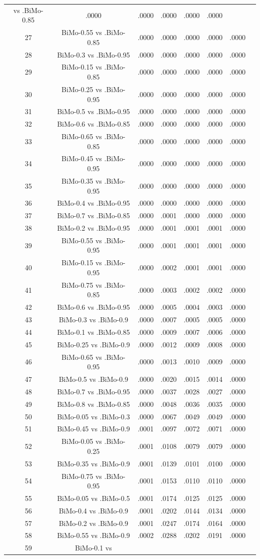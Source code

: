 \documentclass[a4paper,10pt]{article}
\begin{document}
\begin{landscape}
\begin{table}[!htp]
\begin{tabular}{cccccccc}
vs .BiMo-0.85&.0000&.0000&.0000&.0000&.0000\\27&BiMo-0.55 vs .BiMo-0.85&.0000&.0000&.0000&.0000&.0000\\28&BiMo-0.3 vs .BiMo-0.95&.0000&.0000&.0000&.0000&.0000\\29&BiMo-0.15 vs .BiMo-0.85&.0000&.0000&.0000&.0000&.0000\\30&BiMo-0.25 vs .BiMo-0.95&.0000&.0000&.0000&.0000&.0000\\31&BiMo-0.5 vs .BiMo-0.95&.0000&.0000&.0000&.0000&.0000\\32&BiMo-0.6 vs .BiMo-0.85&.0000&.0000&.0000&.0000&.0000\\33&BiMo-0.65 vs .BiMo-0.85&.0000&.0000&.0000&.0000&.0000\\34&BiMo-0.45 vs .BiMo-0.95&.0000&.0000&.0000&.0000&.0000\\35&BiMo-0.35 vs .BiMo-0.95&.0000&.0000&.0000&.0000&.0000\\36&BiMo-0.4 vs .BiMo-0.95&.0000&.0000&.0000&.0000&.0000\\37&BiMo-0.7 vs .BiMo-0.85&.0000&.0001&.0000&.0000&.0000\\38&BiMo-0.2 vs .BiMo-0.95&.0000&.0001&.0001&.0001&.0000\\39&BiMo-0.55 vs .BiMo-0.95&.0000&.0001&.0001&.0001&.0000\\40&BiMo-0.15 vs .BiMo-0.95&.0000&.0002&.0001&.0001&.0000\\41&BiMo-0.75 vs .BiMo-0.85&.0000&.0003&.0002&.0002&.0000\\42&BiMo-0.6 vs .BiMo-0.95&.0000&.0005&.0004&.0003&.0000\\43&BiMo-0.3 vs .BiMo-0.9&.0000&.0007&.0005&.0005&.0000\\44&BiMo-0.1 vs .BiMo-0.85&.0000&.0009&.0007&.0006&.0000\\45&BiMo-0.25 vs .BiMo-0.9&.0000&.0012&.0009&.0008&.0000\\46&BiMo-0.65 vs .BiMo-0.95&.0000&.0013&.0010&.0009&.0000\\47&BiMo-0.5 vs .BiMo-0.9&.0000&.0020&.0015&.0014&.0000\\48&BiMo-0.7 vs .BiMo-0.95&.0000&.0037&.0028&.0027&.0000\\49&BiMo-0.8 vs .BiMo-0.85&.0000&.0048&.0036&.0035&.0000\\50&BiMo-0.05 vs .BiMo-0.3&.0000&.0067&.0049&.0049&.0000\\51&BiMo-0.45 vs .BiMo-0.9&.0001&.0097&.0072&.0071&.0000\\52&BiMo-0.05 vs .BiMo-0.25&.0001&.0108&.0079&.0079&.0000\\53&BiMo-0.35 vs .BiMo-0.9&.0001&.0139&.0101&.0100&.0000\\54&BiMo-0.75 vs .BiMo-0.95&.0001&.0153&.0110&.0110&.0000\\55&BiMo-0.05 vs .BiMo-0.5&.0001&.0174&.0125&.0125&.0000\\56&BiMo-0.4 vs .BiMo-0.9&.0001&.0202&.0144&.0134&.0000\\57&BiMo-0.2 vs .BiMo-0.9&.0001&.0247&.0174&.0164&.0000\\58&BiMo-0.55 vs .BiMo-0.9&.0002&.0288&.0202&.0191&.0000\\59&BiMo-0.1 vs 
\end{tabular}
\end{table}
\end{landscape}
\end{document}
